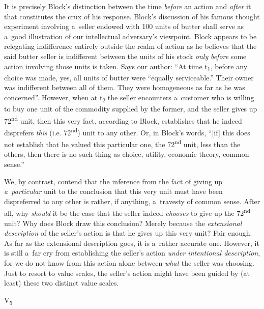 It is precisely Block's distinction between the time \textit{before} an action and \textit{after} it that constitutes the crux of his response. Block's 
\parencite*[][p.52]{block_response_2022} %
 discussion of his famous thought experiment involving a~seller endowed with 100 units of butter shall serve as a~good illustration of our intellectual adversary's viewpoint. Block appears to be relegating indifference entirely outside the realm of action as he believes that the said butter seller is indifferent between the units of his stock \textit{only} \textit{before} some action involving those units is taken. Says our author: ``At time t\textsubscript{1}, before any choice was made, yes, all units of butter were ``equally serviceable.'' Their owner was indifferent between all of them. They were homogeneous as far as he was concerned''. However, when at t\textsubscript{2} the seller encounters a~customer who is willing to buy one unit of the commodity supplied by the former, and the seller gives up 72\textsuperscript{nd }unit, then this very fact, according to Block, establishes that he indeed disprefers \textit{this} (i.e. 72\textsuperscript{nd}) unit to any other. Or, in Block's words, ``[if] this does not establish that he valued this particular one, the 72\textsuperscript{nd} unit, less than the others, then there is no such thing as choice, utility, economic theory, common sense.''



We, by contrast, contend that the inference from the fact of giving up \textit{a~particular} unit to the conclusion that this very unit must have been dispreferred to any other is rather, if anything, a~travesty of common sense. After all, why \textit{should} it be the case that the seller indeed \textit{chooses} to give up the 72\textsuperscript{nd} unit? Why does Block draw this conclusion? Merely because the \textit{extensional description} of the seller's action is that he gives up this very unit? Fair enough. As far as the extensional description goes, it is a~rather accurate one. However, it is still a~far cry from establishing the seller's action \textit{under intentional description}, for we do not know from this action alone between \textit{what} the seller was choosing. Just to resort to value scales, the seller's action might have been guided by (at least) these two distinct value scales.



V\textsubscript{5}



